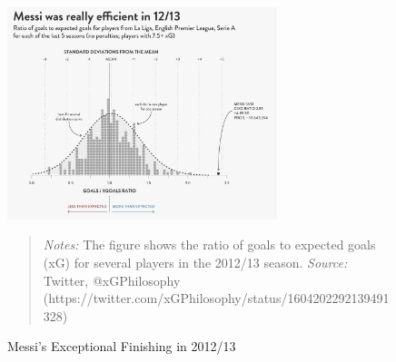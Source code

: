 \begin{figure}[h!]
    \centering
    \includegraphics[width=0.7\textwidth]{graphics/messi_2012.jpg} %
    \caption{Messi's Exceptional Finishing in 2012/13}
    \label{fig:messi_goals_xg_2012}
    \begin{quote}
        \textit{Notes:} 
        The figure shows the ratio of goals to expected goals (xG) for several 
        players in the 2012/13 season.
        \textit{Source:} Twitter, @xGPhilosophy (https://twitter.com/xGPhilosophy/status/1604202292139491328) 
    \end{quote} 
\end{figure}
